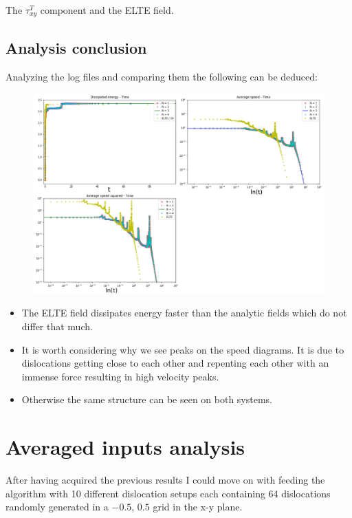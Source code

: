 \documentclass[12pt,a4paper]{article}
\theoremstyle{plain}
\begin{document}
\begin{multicols*}{2}
	\par The ${\tau}^{T}_{xy}$ component and the ELTE field.

	\subsection{Analysis conclusion}

	\par Analyzing the log files and comparing them the following can be deduced:

	\begin{figure}[H]
		\centering
		\includegraphics[width=0.95\columnwidth]{all.png}
	\end{figure}

	\begin{itemize}
		\item The ELTE field dissipates energy faster than the analytic fields which do not differ that much.
		\item It is worth considering why we see peaks on the speed diagrams. It is due to dislocations getting close to each other and repenting each other with an immense force resulting in high velocity peaks.
		\item Otherwise the same structure can be seen on both systems.
	\end{itemize}

	\section{Averaged inputs analysis}

	\par After having acquired the previous results I could move on with feeding
	the algorithm with 10 different dislocation setups each containing 64 dislocations
	randomly generated in a $-0.5$, $0.5$ grid in the x-y plane.


\end{multicols*}
\end{document}

